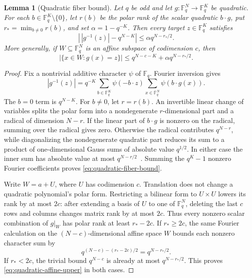 \documentclass[11pt]{article}
\newtheorem{lemma}[lemma]{Lemma}
\newcommand{\F}{\mathbb F}
\begin{document}
\begin{lemma}[Quadratic fiber bound]\label{lem:quadratic-fiber-bound}
Let $q$ be odd and let $g:\F_q^N\to\F_q^K$ be quadratic.  For each
$b\in\F_q^K\setminus\{0\}$, let $r(b)$ be the polar rank of the scalar
quadratic $b\cdot g$, put $r_*=\min_{b\ne0}r(b)$, and set
$\alpha=1-q^{-K}$.  Then every target $z\in\F_q^K$ satisfies
\begin{equation}\label{eq:quadratic-fiber-bound}
 \left|\,|g^{-1}(z)|-q^{N-K}\right|
 \le \alpha q^{N-r_*/2}.
\end{equation}
More generally, if $W\subseteq\F_q^N$ is an affine subspace of codimension
$c$, then
\begin{equation}\label{eq:quadratic-affine-upper}
 |\{x\in W:g(x)=z\}|
 \le q^{N-c-K}+\alpha q^{N-r_*/2}.
\end{equation}
\end{lemma}

\begin{proof}
Fix a nontrivial additive character $\psi$ of $\F_q$.  Fourier inversion gives
\[
 |g^{-1}(z)|
 =q^{-K}\sum_{b\in\F_q^K}\psi(-b\cdot z)
   \sum_{x\in\F_q^N}\psi(b\cdot g(x)).
\]
The $b=0$ term is $q^{N-K}$.  For $b\ne0$, let $r=r(b)$.  An invertible
linear change of variables splits the polar form into a nondegenerate
$r$-dimensional part and a radical of dimension $N-r$.  If the linear part of
$b\cdot g$ is nonzero on the radical, summing over the radical gives zero.
Otherwise the radical contributes $q^{N-r}$, while diagonalizing the
nondegenerate quadratic part reduces its sum to a product of one-dimensional
Gauss sums of absolute value $q^{1/2}$.  In either case the inner sum has
absolute value at most $q^{N-r/2}$~\cite{Lam2005}.  Summing the $q^K-1$
nonzero Fourier coefficients proves \eqref{eq:quadratic-fiber-bound}.

Write $W=a+U$, where $U$ has codimension $c$.  Translation does not change a
quadratic polynomial's polar form.  Restricting a bilinear form to
$U\times U$ lowers its rank by at most $2c$: after extending a basis of $U$ to
one of $\F_q^N$, deleting the last $c$ rows and columns changes matrix rank by
at most $2c$.  Thus every nonzero scalar combination of $g|_W$ has polar rank
at least $r_*-2c$.  If $r_*\ge2c$, the same Fourier calculation on the
$(N-c)$-dimensional affine space $W$ bounds each nonzero character sum by
\[
 q^{(N-c)-(r_*-2c)/2}=q^{N-r_*/2}.
\]
If $r_*<2c$, the trivial bound $q^{N-c}$ is already at most
$q^{N-r_*/2}$.  This proves \eqref{eq:quadratic-affine-upper} in both cases.
\end{proof}
\end{document}
